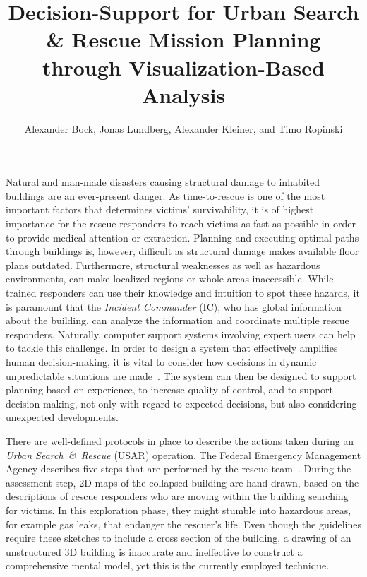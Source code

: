 \documentclass[review,journal]{vgtc}         %
\title{Decision-Support for Urban Search \& Rescue Mission Planning\\ through Visualization-Based Analysis}
\author{Alexander Bock, Jonas Lundberg, Alexander Kleiner, and Timo Ropinski}
\begin{document}

\maketitle

\vspace{-0.15cm}

Natural and man-made disasters causing structural damage to inhabited buildings are an ever-present danger. As time-to-rescue is one of the most important factors that determines victims' survivability, it is of highest importance for the rescue responders to reach victims as fast as possible in order to provide medical attention or extraction. Planning and executing optimal paths through buildings is, however, difficult as structural damage makes available floor plans outdated. Furthermore, structural weaknesses as well as hazardous environments, can make localized regions or whole areas inaccessible. While trained responders can use their knowledge and intuition to spot these hazards, it is paramount that the \emph{Incident Commander} (IC), who has global information about the building, can analyze the information and coordinate multiple rescue responders. Naturally, computer support systems involving expert users can help to tackle this challenge. In order to design a system that effectively amplifies human decision-making, it is vital to consider how decisions in dynamic unpredictable situations are made~\cite{Lundberg2012}. The system can then be designed to support planning based on experience, to increase quality of control, and to support decision-making, not only with regard to expected decisions, but also considering unexpected developments.

There are well-defined protocols in place to describe the actions taken during an \emph{Urban Search~\&~Rescue} (USAR) operation. The Federal Emergency Management Agency describes five steps that are performed by the rescue team~\cite{fema08}. During the assessment step, 2D maps of the collapsed building are hand-drawn, based on the descriptions of rescue responders who are moving within the building searching for victims. In this exploration phase, they might stumble into hazardous areas, for example gas leaks, that endanger the rescuer's life. Even though the guidelines require these sketches to include a cross section of the building, a drawing of an unstructured 3D building is inaccurate and ineffective to construct a comprehensive mental model, yet this is the currently employed technique.
\end{document}
